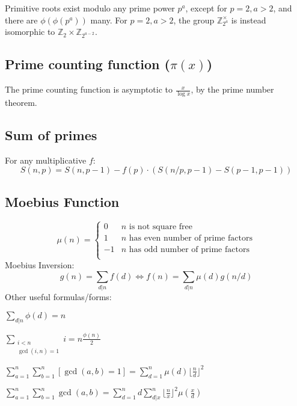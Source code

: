 	Primitive roots exist modulo any prime power $p^a$, except for $p = 2, a > 2$, and there are $\phi(\phi(p^a))$ many.
	For $p = 2, a > 2$, the group $\mathbb Z_{2^a}^\times$ is instead isomorphic to $\mathbb Z_2 \times \mathbb Z_{2^{a-2}}$.

\subsection{Prime counting function ($\pi(x)$)} 
The prime counting function is asymptotic to $\frac{x}{\log x}$, by the prime number theorem.
      
\subsection{Sum of primes} For any multiplicative $f$:
                \[ S(n,p) = S(n, p-1) - f(p) \cdot (S(n/p,p-1) - S(p-1,p-1))\]

\subsection{Moebius Function}
\[
	\mu(n) = \begin{cases} 0 & n \textrm{ is not square free}\\ 1 & n \textrm{ has even number of prime factors}\\ -1 & n \textrm{ has odd number of prime factors}\\\end{cases}
\]
  Moebius Inversion:
  \[ g(n) = \sum_{d|n} f(d) \Leftrightarrow f(n) = \sum_{d|n} \mu(d)g(n/d) \]
  Other useful formulas/forms:

  $ \sum_{d|n} \phi(d) = n $
  
  $\sum_{\substack{i<n\\ \gcd(i,n)=1}} i = n \frac{\phi(n)}{2} $

  $ \sum_{a=1}^n \sum_{b=1}^n [ \gcd(a, b) = 1] = \sum_{d=1}^n \mu(d) {\lfloor \frac{n}{d} \rfloor}^2 $

  $ \sum_{a=1}^n \sum_{b=1}^n \gcd(a, b) = \sum_{d=1}^n d \sum_{d|x}^n {\lfloor \frac{n}{x} \rfloor}^2 \mu{(\frac{x}{d})} $
  
